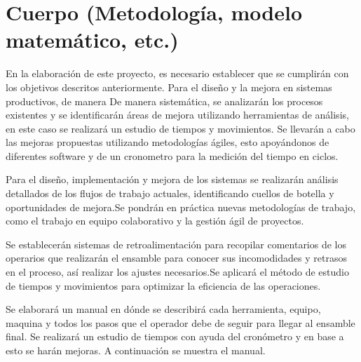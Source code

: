         
        \section{Cuerpo (Metodología, modelo matemático, etc.)}
        
        
        
        
        En la elaboración de este proyecto, es necesario establecer que se cumplirán con los objetivos descritos anteriormente. Para el diseño y la mejora en sistemas productivos, de manera De manera sistemática, se analizarán los procesos existentes y se identificarán áreas de mejora utilizando herramientas de análisis, en este caso se realizará un estudio de tiempos y movimientos. Se llevarán a cabo las mejoras propuestas utilizando metodologías ágiles, esto apoyándonos de diferentes software y de un cronometro para la medición del tiempo en ciclos.
        
        
        Para el diseño, implementación y mejora de los sistemas se realizarán análisis detallados de los flujos de trabajo actuales, identificando cuellos de botella y oportunidades de mejora.Se pondrán en práctica nuevas metodologías de trabajo, como el trabajo en equipo colaborativo y la gestión ágil de proyectos.
        
        
        Se establecerán sistemas de retroalimentación para recopilar comentarios de los operarios que realizarán el ensamble para conocer sus incomodidades y retrasos en el proceso, así realizar los ajustes necesarios.Se aplicará el método de estudio de tiempos y movimientos para optimizar la eficiencia de las operaciones.
        
        Se elaborará un manual en dónde se describirá cada herramienta, equipo, maquina y todos los pasos que el operador debe de seguir para llegar al ensamble final. Se realizará un estudio de tiempos con ayuda del cronómetro y en base a esto se harán mejoras. A continuación se muestra el manual.
        
        
        
        
        
        \appendix
        
